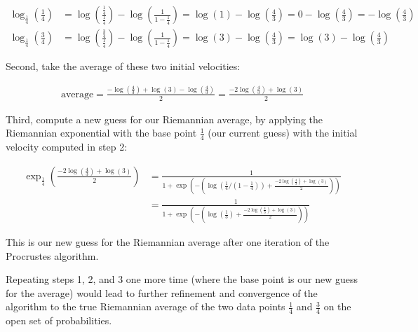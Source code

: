 \documentclass{article}
\begin{document}
\begin{align*}
\log_{\frac{1}{4}}(\frac{1}{4}) &= \log\left(\frac{\frac{1}{4}}{\frac{1}{4}}\right) - \log\left(\frac{1}{1-\frac{1}{4}}\right) = \log(1) - \log\left(\frac{4}{3}\right) = 0 - \log\left(\frac{4}{3}\right) = -\log\left(\frac{4}{3}\right) \\
\log_{\frac{1}{4}}(\frac{3}{4}) &= \log\left(\frac{\frac{3}{4}}{\frac{1}{4}}\right) - \log\left(\frac{1}{1-\frac{1}{4}}\right) = \log(3) - \log\left(\frac{4}{3}\right) = \log(3) - \log\left(\frac{4}{3}\right)
\end{align*}

Second, take the average of these two initial velocities:

\begin{align*}
\text{average} = \frac{-\log\left(\frac{4}{3}\right) + \log(3) - \log\left(\frac{4}{3}\right)}{2} = \frac{-2\log\left(\frac{4}{3}\right) + \log(3)}{2}
\end{align*}

Third, compute a new guess for our Riemannian average, by applying the Riemannian exponential with the base point $\frac{1}{4}$ (our current guess) with the initial velocity computed in step 2:

\begin{align*}
\exp_{\frac{1}{4}}\left(\frac{-2\log\left(\frac{4}{3}\right) + \log(3)}{2}\right) &= \frac{1}{1 + \exp\left(-\left(\log\left(\frac{1}{4}/(1-\frac{1}{4})\right) + \frac{-2\log\left(\frac{4}{3}\right) + \log(3)}{2}\right)\right)} \\
&= \frac{1}{1 + \exp\left(-\left(\log\left(\frac{1}{3}\right) + \frac{-2\log\left(\frac{4}{3}\right) + \log(3)}{2}\right)\right)}
\end{align*}

This is our new guess for the Riemannian average after one iteration of the Procrustes algorithm.

Repeating steps 1, 2, and 3 one more time (where the base point is our new guess for the average) would lead to further refinement and convergence of the algorithm to the true Riemannian average of the two data points $\frac{1}{4}$ and $\frac{3}{4}$ on the open set of probabilities.
\end{document}
